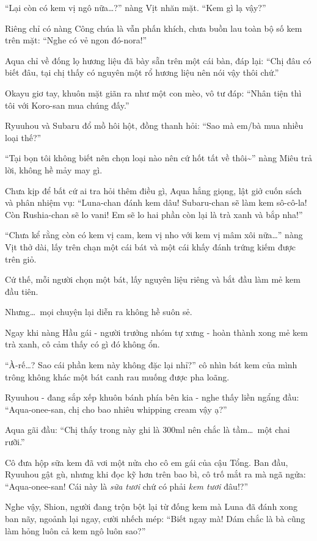 \documentclass[../main.tex]{subfiles}
\begin{document}
``Lại còn có kem vị ngô nữa\dots?'' nàng Vịt nhăn mặt. ``Kem gì lạ vậy?''

Riêng chỉ có nàng Công chúa là vẫn phấn khích, chưa buồn lau toàn bộ số kem trên mặt: ``Nghe có vẻ ngon đó-nora!''

Aqua chỉ về đống lọ hương liệu đã bày sẵn trên một cái bàn, đáp lại: ``Chị đâu có biết đâu, tại chị thấy có nguyên một rổ hương liệu nên nói vậy thôi chứ.''

Okayu giơ tay, khuôn mặt giãn ra như một con mèo, vô tư đáp: ``Nhân tiện thì tôi với Koro-san mua chúng đấy.''

Ryuuhou và Subaru đổ mồ hôi hột, đồng thanh hỏi: ``Sao mà em/bà mua nhiều loại thế?''

``Tại bọn tôi không biết nên chọn loại nào nên cứ hốt tất về thôi\~{}'' nàng Miêu trả lời, không hề mảy may gì.

Chưa kịp để bất cứ ai tra hỏi thêm điều gì, Aqua hắng giọng, lật giở cuốn sách và phân nhiệm vụ: ``Luna-chan đánh kem dâu! Subaru-chan sẽ làm kem sô-cô-la! Còn Rushia-chan sẽ lo vani! Em sẽ lo hai phần còn lại là trà xanh và bắp nha!''

``Chưa kể rằng còn có kem vị cam, kem vị nho với kem vị mâm xôi nữa\dots'' nàng Vịt thở dài, lấy trên chạn một cái bát và một cái khấy đánh trứng kiếm được trên giỏ.

Cứ thế, mỗi người chọn một bát, lấy nguyên liệu riêng và bắt đầu làm mẻ kem đầu tiên.

Nhưng\dots\ mọi chuyện lại diễn ra không hề suôn sẻ.

Ngay khi nàng Hầu gái - người trưởng nhóm tự xưng - hoàn thành xong mẻ kem trà xanh, cô cảm thấy có gì đó không ổn.

``À-rế\dots? Sao cái phần kem này không đặc lại nhỉ?'' cô nhìn bát kem của mình trông không khác một bát canh rau muống được pha loãng.

Ryuuhou - đang sắp xếp khuôn bánh phía bên kia - nghe thấy liền ngẩng đầu: ``Aqua-onee-san, chị cho bao nhiêu whipping cream vậy ạ?''

Aqua gãi đầu: ``Chị thấy trong này ghi là 300ml nên chắc là tầm\dots\ một chai rưỡi.''

Cô đưa hộp sữa kem đã vơi một nửa cho cô em gái của cậu Tổng. Ban đầu, Ryuuhou gật gù, nhưng khi đọc kỹ hơn trên bao bì, cô trố mắt ra mà ngã ngửa: ``Aqua-onee-san! Cái này là \emph{sữa tươi} chứ có phải \emph{kem tươi} đâu!?''

Nghe vậy, Shion, người đang trộn bột lại từ đống kem mà Luna đã đánh xong ban nãy, ngoảnh lại ngay, cười nhếch mép: ``Biết ngay mà! Dám chắc là bà cũng làm hỏng luôn cả kem ngô luôn sao?''
\end{document}

